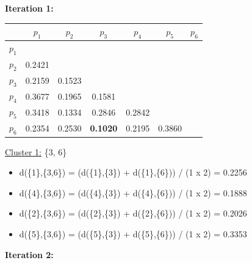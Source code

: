\documentclass[11pt]{article}
\begin{document}
	\textbf{Iteration 1:}
	
	\begin{center}
    	\begin{adjustbox}{max width=\textwidth}
		\begin{tabular}{ | c | c | c | c | c | c | c |}
	  	 	\hline

	  	 	& \textbf{$p_1$} & \textbf{$p_2$} & \textbf{$p_3$} & \textbf{$p_4$} & \textbf{$p_5$} & \textbf{$p_6$}\\
	  	 	\hline
	  	 	
	  	 	\textbf{$p_1$} &  &  &  &  &  &\\
	  	 	\hline
	  	 	
	  	 	\textbf{$p_2$} & 0.2421 &  &  &  &  &  \\
	  	 	\hline
	  	 	
	  	 	\textbf{$p_3$} & 0.2159 & 0.1523 &  &  &  & \\
	  	 	\hline
	  	 	
	  	 	\textbf{$p_4$} & 0.3677 & 0.1965 & 0.1581 &  &  & \\
	  	 	\hline
	  	 	
	  	 	\textbf{$p_5$} & 0.3418 & 0.1334 & 0.2846 & 0.2842 &  & \\
	  	 	\hline	
	  	 	
	  	 	\textbf{$p_6$} & 0.2354 & 0.2530 & \textbf{0.1020} & 0.2195 & 0.3860 & \\
	  	 	\hline			
    		\end{tabular}
    	\end{adjustbox}
	\end{center}
	
	\underline{Cluster 1:} \{3, 6\} \\
	
	\begin{itemize}
		\item d(\{1\},\{3,6\}) = (d(\{1\},\{3\}) + d(\{1\},\{6\})) / (1 x 2) = 0.2256
		\item d(\{4\},\{3,6\}) = (d(\{4\},\{3\}) + d(\{4\},\{6\})) / (1 x 2) = 0.1888
		\item d(\{2\},\{3,6\}) = (d(\{2\},\{3\}) + d(\{2\},\{6\})) / (1 x 2) = 0.2026
		\item d(\{5\},\{3,6\}) = (d(\{5\},\{3\}) + d(\{5\},\{6\})) / (1 x 2) = 0.3353
	\end{itemize}
	
	
	\textbf{Iteration 2:}
	
\end{document}
